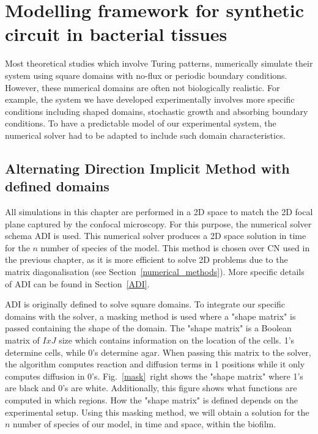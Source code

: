 \section{Modelling framework for synthetic circuit in bacterial tissues}
Most theoretical studies which involve Turing patterns, numerically simulate their system using square domains with no-flux or periodic boundary conditions.
However, these numerical domains are often not biologically realistic.
For example, the system we have developed experimentally involves more specific conditions including shaped domains, stochastic growth and absorbing boundary conditions.
To have a predictable model of our experimental system, the numerical solver had to be adapted to include such domain characteristics.

\subsection{Alternating Direction Implicit Method with defined domains}\label{Alternating Direction Implicit Method with defined domains}
All simulations in this chapter are performed in a \acrshort{2D} space to match the \acrshort{2D} focal plane captured by the confocal microscopy.
For this purpose, the numerical solver schema  \acrfull{ADI} is used.
This numerical solver produces a 2D space solution in time for the $n$ number of species of the model.
This method is chosen over \acrfull{CN} used in the previous chapter, as it is more efficient to solve 2D problems due to the matrix diagonalisation (see Section~\ref{numerical_methods}). More specific details of ADI can be found in Section~\ref{ADI}.



ADI is originally defined to solve square domains.
To integrate our specific domains with the solver, a masking method is used where a "shape matrix" is passed containing the shape of the domain.
The "shape matrix" is a Boolean matrix of $IxJ$ size which contains information on the location of the cells.
1's determine cells, while 0's determine agar.
When passing this matrix to the solver, the algorithm computes reaction and diffusion terms in 1 positions while it only computes diffusion in 0's.
Fig.~\ref{mask}~right shows the "shape matrix" where 1's are black and 0's are white.
Additionally, this figure shows what functions are computed in which regions.
How the "shape matrix" is defined depends on the experimental setup.
Using this masking method, we will obtain a solution for the $n$ number of species of our model, in time and space, within the biofilm.

